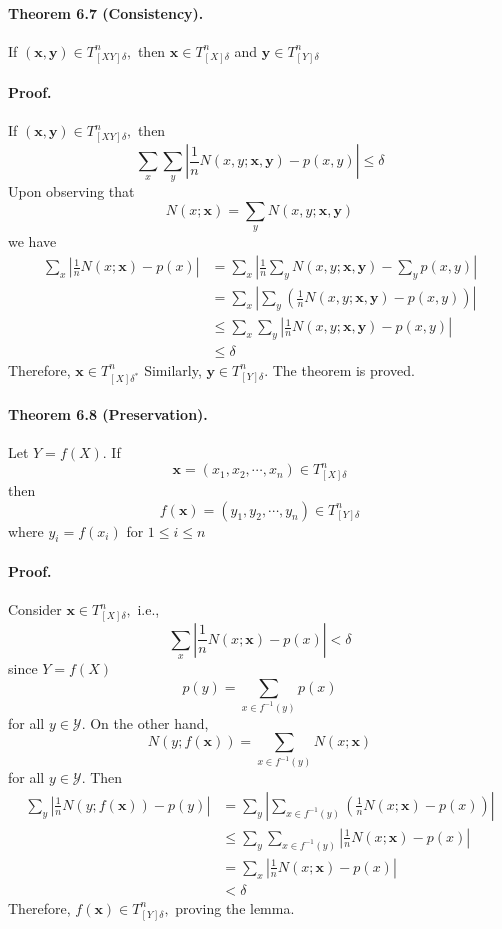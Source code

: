 \documentclass[8pt]{article}
\begin{document}
\begin{tcolorbox}
\paragraph{Theorem 6.7 (Consistency).} If $(\mathbf{x}, \mathbf{y}) \in T_{[X Y] \delta}^{n},$ then $\mathbf{x} \in T_{[X] \delta}^{n}$ and $\mathbf{y} \in T_{[Y] \delta}^{n}$
\end{tcolorbox}
\paragraph{Proof.} If $(\mathbf{x}, \mathbf{y}) \in T_{[X Y] \delta}^{n},$ then
$$
\sum_{x} \sum_{y}\left|\frac{1}{n} N(x, y ; \mathbf{x}, \mathbf{y})-p(x, y)\right| \leq \delta
$$
Upon observing that
$$
N(x ; \mathbf{x})=\sum_{y} N(x, y ; \mathbf{x}, \mathbf{y})
$$
we have
$$
\begin{aligned}
	\sum_{x}\left|\frac{1}{n} N(x ; \mathbf{x})-p(x)\right| 
	&=\sum_{x}\left|\frac{1}{n} \sum_{y} N(x, y ; \mathbf{x}, \mathbf{y})-\sum_{y} p(x, y)\right| \\
	&=\sum_{x}\left|\sum_{y}\left(\frac{1}{n} N(x, y ; \mathbf{x}, \mathbf{y})-p(x, y)\right)\right| \\
	&\leq \sum_{x} \sum_{y}\left|\frac{1}{n} N(x, y ; \mathbf{x}, \mathbf{y})-p(x, y)\right| \\
	&\leq \delta
\end{aligned}
$$
Therefore, $\mathbf{x} \in T_{[X] \delta^{*}}^{n}$ Similarly, $\mathbf{y} \in T_{[Y] \delta}^{n} .$ The theorem is proved.
\begin{tcolorbox}
\paragraph{Theorem 6.8 (Preservation).} 
Let $Y=f(X) $. If
$$
\mathbf{x}=\left(x_{1}, x_{2}, \cdots, x_{n}\right) \in T_{[X] \delta}^{n}
$$
then
$$
f(\mathbf{x})=\left(y_{1}, y_{2}, \cdots, y_{n}\right) \in T_{[Y] \delta}^{n}
$$
where $y_{i}=f\left(x_{i}\right)$ for $1 \leq i \leq n$
\end{tcolorbox}
\paragraph{Proof.} Consider $\mathbf{x} \in T_{[X] \delta}^{n},$ i.e.,
$$
\sum_{x}\left|\frac{1}{n} N(x ; \mathbf{x})-p(x)\right|<\delta
$$
since $Y=f(X)$
$$
p(y)=\sum_{x \in f^{-1}(y)} p(x)
$$
for all $y \in \mathcal{Y}$. On the other hand,
$$
N(y ; f(\mathbf{x}))=\sum_{x \in f^{-1}(y)} N(x ; \mathbf{x})
$$
for all $y \in \mathcal{Y}$. Then
$$
\begin{aligned}
	\sum_{y}\left|\frac{1}{n} N(y ; f(\mathbf{x}))-p(y)\right|
	&=\sum_{y}\left|\sum_{x \in f^{-1}(y)}\left(\frac{1}{n} N(x ; \mathbf{x})-p(x)\right)\right| \\
	&\leq \sum_{y} \sum_{x \in f^{-1}(y)}\left|\frac{1}{n} N(x ; \mathbf{x})-p(x)\right| \\
	&=\sum_{x}\left|\frac{1}{n} N(x ; \mathbf{x})-p(x)\right| \\
	&<\delta
\end{aligned}
$$
Therefore, $f(\mathbf{x}) \in T_{[Y] \delta}^{n},$ proving the lemma.
\end{document}
